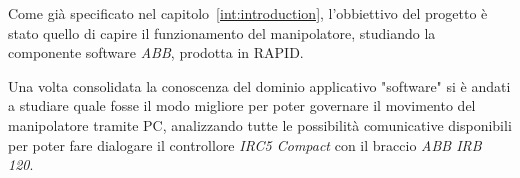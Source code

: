 Come già specificato nel capitolo~\vref{int:introduction}, l'obbiettivo del progetto è stato quello di capire il funzionamento del manipolatore, studiando la componente software \emph{ABB}, prodotta in RAPID. 

Una volta consolidata la conoscenza del dominio applicativo "software" si è andati a studiare quale fosse il modo migliore per poter governare il movimento del manipolatore tramite PC, analizzando tutte le possibilità comunicative disponibili per poter fare dialogare il controllore \emph{IRC5 Compact} con il braccio \emph{ABB IRB 120}.
